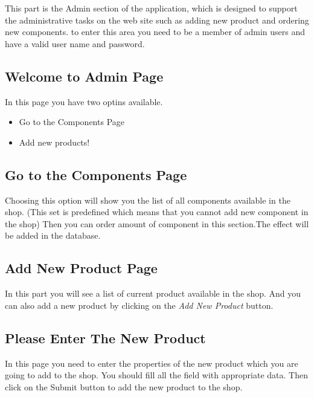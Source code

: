 \documentclass[a4paper,12pt]{article}
\begin{document}
This part is the Admin section of the application, which is designed to support the administrative tasks on the
web site such as adding new product and ordering new components.
to enter this area you need to be a member of admin users and have a valid user name and password.




\subsection*{Welcome to Admin Page}

In this page you have two optins available.

\begin{itemize}

\item Go to the Components Page

\item Add new products!

\end{itemize}




\subsection*{Go to the Components Page}

Choosing this option will show you the list of all components available in the shop.
(This set is predefined which means that you cannot add new component in the shop)
Then you can order amount of component in this section.The effect will be added in the database.


\subsection*{Add New Product Page}
In this part you will see a list of current product available in the shop. And you can also add a new product by
clicking on the {\it Add New Product} button.




\subsection*{Please Enter The New Product}

In this page you need to enter the properties of the new product which you are going to add to the shop.
You should fill all the field with appropriate data. Then click on the Submit button to add the new product
to the shop.
\end{document}
